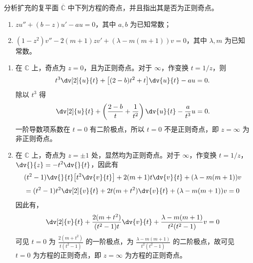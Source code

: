 \begin{question}
分析扩充的复平面 \(\overline{\mathbb{C}}\) 中下列方程的奇点，并且指出其是否为正则奇点。
\begin{enumerate}
  \item \(z u''+(b-z) u'-a u =0\)，其中 \(a,b\) 为已知常数；
  \item \((1-z^2) v''-2(m+1)z v'+(\lambda-m(m+1)) v= 0\)，其中 \(\lambda,m\) 为已知常数。
\end{enumerate}
\begin{solution}
\begin{enumerate}
  \item 在 \(\mathbb{C}\) 上，奇点为 \(z=0\)，且为正则奇点。对于 \(\infty\)，作变换 \(t=1/z\)，则
  \[
  t^3\dv[2]{u}{t}
  +\bigl[(2-b)t^2+t\bigr]\dv{u}{t}
  -au=0.
  \]
  除以 \(t^3\) 得
  \[
  \dv[2]{u}{t}
  +\left(\frac{2-b}{t}+\frac1{t^2}\right)\dv{u}{t}
  -\frac{a}{t^3}u=0.
  \]
  一阶导数项系数在 \(t=0\) 有二阶极点，所以 \(t=0\) 不是正则奇点，即 \(z=\infty\) 为非正则奇点。
  \item 在 \(\mathbb{C}\) 上，奇点为 \(z=\pm1\) 处，显然均为正则奇点。对于 \(\infty\)，作变换 \(t=1/z\)，\(\displaystyle\dv{}{z}=-t^2\dv{}{t}\)，因此有 \[ (t^2-1)\dv{}{t}\bigl[t^2\dv{v}{t}\bigr]+2(m+1)t\dv{v}{t}+(\lambda-m(m+1))v \] \[ =(t^2-1)t^2\dv[2]{v}{t}+2t(m+t^2)\dv{v}{t}+(\lambda-m(m+1))v=0 \]因此有，\[ \dv[2]{v}{t}+\frac{2(m+t^2)}{(t^2-1)t}\dv{v}{t}+\frac{\lambda-m(m+1)}{t^2(t^2-1)}v=0 \]可见 \(t=0\) 为 \(\frac{2(m+t^2)}{t(t^2-1)}\) 的一阶极点，为 \(\frac{\lambda-m(m+1)}{t^2(t^2-1)}\) 的二阶极点，故可见 \(t=0\) 为方程的正则奇点，即 \(z=\infty\) 为方程的正则奇点。
\end{enumerate}
\end{solution}
\end{question}


